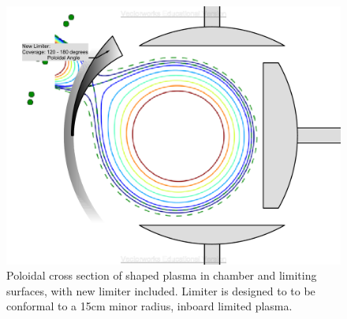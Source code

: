\begin{figure}
\includegraphics[width = \textwidth]{./figures/Poloidal_Cross_Section_shaping_plus_new_limter_v2013.pdf}\begin{flushleft}
\caption{Poloidal cross section of shaped plasma in chamber and limiting surfaces, with new limiter included.  Limiter is designed to to be conformal to a 15cm minor radius, inboard limited plasma.}
\end{flushleft}
\label{new_limiters}
\end{figure}